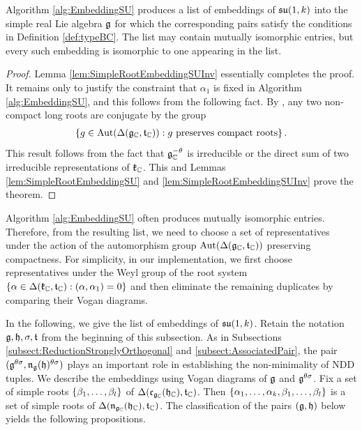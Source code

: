 \begin{theorem}
	Algorithm \ref{alg:EmbeddingSU} produces a list of embeddings of $\mathfrak{su}(1, k)$ into the simple real Lie algebra $\mathfrak{g}$ for which the corresponding pairs satisfy the conditions in Definition \ref{def:typeBC}.
	The list may contain mutually isomorphic entries, but every such embedding is isomorphic to one appearing in the list.
\end{theorem}

\begin{proof}
	Lemma \ref{lem:SimpleRootEmbeddingSUInv} essentially completes the proof.
	It remains only to justify the constraint that $\alpha_1$ is fixed in Algorithm \ref{alg:EmbeddingSU}, and this follows from the following fact.
	By \cite[Chapter XII. Problem 21]{Kn01}, any two non-compact long roots are conjugate by the group
	\begin{align*}
		\left\{g \in \operatorname{Aut}(\Delta(\mathfrak{g}_{\mathbb{C}}, \mathfrak{t}_{\mathbb{C}})): g\text{ preserves compact roots} \right\}.
	\end{align*}
	This result follows from the fact that $\mathfrak{g}_{\mathbb{C}}^{-\theta}$ is irreducible or the direct sum of two irreducible representations of $\mathfrak{k}_{\mathbb{C}}$.
	This and Lemmas \ref{lem:SimpleRootEmbeddingSU} and \ref{lem:SimpleRootEmbeddingSUInv} prove the theorem.
\end{proof}

Algorithm \ref{alg:EmbeddingSU} often produces mutually isomorphic entries.
Therefore, from the resulting list, we need to choose a set of representatives under the action of the automorphism group $\operatorname{Aut}(\Delta(\mathfrak{g}_{\mathbb{C}}, \mathfrak{t}_{\mathbb{C}}))$ preserving compactness.
For simplicity, in our implementation, we first choose representatives under the Weyl group of the root system $\left\{\alpha \in \Delta(\mathfrak{k}_{\mathbb{C}}, \mathfrak{t}_{\mathbb{C}}): (\alpha, \alpha_1) = 0 \right\}$ and then eliminate the remaining duplicates by comparing their Vogan diagrams.

In the following, we give the list of embeddings of $\mathfrak{su}(1, k)$.
Retain the notation $\mathfrak{g}, \mathfrak{h}, \sigma, \mathfrak{t}$ from the beginning of this subsection.
As in Subsections \ref{subsect:ReductionStronglyOrthogonal} and \ref{subsect:AssociatedPair}, the pair $(\mathfrak{g}^{\theta\sigma}, \mathfrak{n}_{\mathfrak{g}}(\mathfrak{h})^{\theta\sigma})$ plays an important role in establishing the non-minimality of NDD tuples.
We describe the embeddings using Vogan diagrams of $\mathfrak{g}$ and $\mathfrak{g}^{\theta\sigma}$.
Fix a set of simple roots $\left\{\beta_1, \ldots, \beta_l \right\}$ of $\Delta(\mathfrak{c}_{\mathfrak{g}_{\mathbb{C}}}(\mathfrak{h}_{\mathbb{C}}), \mathfrak{t}_{\mathbb{C}})$.
Then $\left\{\alpha_1, \ldots, \alpha_k, \beta_1, \ldots, \beta_l \right\}$ is a set of simple roots of $\Delta(\mathfrak{n}_{\mathfrak{g}_{\mathbb{C}}}(\mathfrak{h}_{\mathbb{C}}), \mathfrak{t}_{\mathbb{C}})$.
The classification of the pairs $(\mathfrak{g},\mathfrak{h})$ below yields the following propositions.

